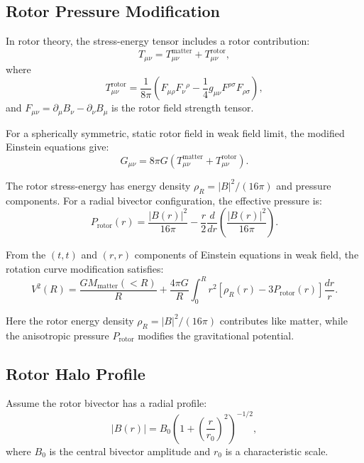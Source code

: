 \documentclass[12pt,a4paper]{article}
\theoremstyle{definition}
\theoremstyle{remark}
\begin{document}
\subsection{Rotor Pressure Modification}

In rotor theory, the stress-energy tensor includes a rotor contribution:
\begin{equation}
T_{\mu\nu} = T_{\mu\nu}^{\text{matter}} + T_{\mu\nu}^{\text{rotor}},
\end{equation}
where
\begin{equation}
T_{\mu\nu}^{\text{rotor}} = \frac{1}{8\pi} \left( F_{\mu\rho} F_\nu{}^\rho - \frac{1}{4} g_{\mu\nu} F^{\rho\sigma} F_{\rho\sigma} \right),
\end{equation}
and $F_{\mu\nu} = \partial_\mu B_\nu - \partial_\nu B_\mu$ is the rotor field strength tensor.

For a spherically symmetric, static rotor field in weak field limit, the modified Einstein equations give:
\begin{equation}
G_{\mu\nu} = 8\pi G \left(T_{\mu\nu}^{\text{matter}} + T_{\mu\nu}^{\text{rotor}}\right).
\end{equation}

The rotor stress-energy has energy density $\rho_R = |B|^2/(16\pi)$ and pressure components. For a radial bivector configuration, the effective pressure is:
\begin{equation}
P_{\text{rotor}}(r) = \frac{|B(r)|^2}{16\pi} - \frac{r}{2}\frac{d}{dr}\left(\frac{|B(r)|^2}{16\pi}\right).
\end{equation}

From the $(t,t)$ and $(r,r)$ components of Einstein equations in weak field, the rotation curve modification satisfies:
\begin{equation}
V^2(R) = \frac{G M_{\text{matter}}(<R)}{R} + \frac{4\pi G}{R} \int_0^R r^2 \left[\rho_R(r) - 3P_{\text{rotor}}(r)\right] \frac{dr}{r}.
\end{equation}

Here the rotor energy density $\rho_R = |B|^2/(16\pi)$ contributes like matter, while the anisotropic pressure $P_{\text{rotor}}$ modifies the gravitational potential.

\subsection{Rotor Halo Profile}

Assume the rotor bivector has a radial profile:
\begin{equation}
|B(r)| = B_0 \left(1 + \left(\frac{r}{r_0}\right)^2\right)^{-1/2},
\end{equation}
where $B_0$ is the central bivector amplitude and $r_0$ is a characteristic scale.
\end{document}
